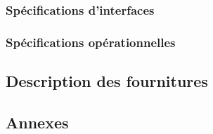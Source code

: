 \documentclass[asi]{picINSA}
\begin{document}
\section{Spécifications d'interfaces}
\label{spec_interface}


\section{Spécifications opérationnelles}
\label{spec_ope}


\chapter{Description des fournitures}
\label{desc_fournitures}


\begin{appendix}
\part*{Annexes}

\listoffigures
{}
	 
\listoftables
{}
\end{appendix}
\pageQuatriemeCouverture
\end{document}
